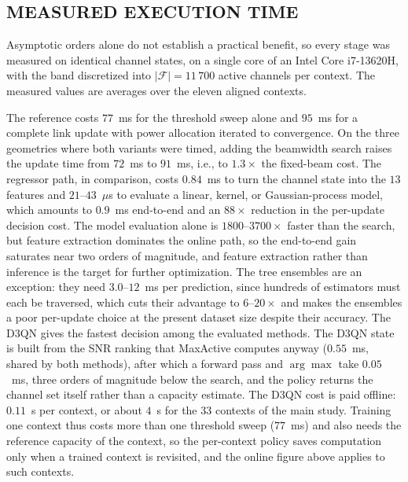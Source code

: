 \documentclass{ieee-ojvt}
\newcommand{\PLNCH}{11\,700}          %
\newcommand{\PLMASEL}{$77$~ms}        %
\newcommand{\PLMASTEP}{$95$~ms}       %
\newcommand{\PLMASTEPBW}{$91$~ms}     %
\newcommand{\PLPREDUS}{$0.9$~ms}      %
\begin{document}
\subsection{MEASURED EXECUTION TIME}
\label{sec:runtime}
Asymptotic orders alone do not establish a practical benefit, so every stage was measured
on identical channel states, on a single core of an Intel Core i7-13620H, with the band
discretized into $|\mathcal{F}|=\PLNCH$ active channels per context. The measured values
are averages over the eleven aligned contexts.

The reference costs \PLMASEL{} for the threshold sweep alone and \PLMASTEP{} for a
complete link update with power allocation iterated to convergence. On the three
geometries where both variants were timed, adding the beamwidth search raises the update
time from $72$~ms to \PLMASTEPBW{}, i.e., to $1.3\times$ the fixed-beam cost. The
regressor path, in comparison, costs $0.84$~ms to turn the channel state into the $13$
features and $21$--$43$~$\mu$s to evaluate a linear, kernel, or Gaussian-process model,
which amounts to \PLPREDUS{} end-to-end and an $88\times$ reduction in the per-update
decision cost. The model evaluation alone is $1800$--$3700\times$ faster than the search,
but feature extraction dominates the online path, so the end-to-end gain saturates near
two orders of magnitude, and feature extraction rather than inference is the target for
further optimization. The tree ensembles are an exception: they need $3.0$--$12$~ms per prediction, since
hundreds of estimators must each be traversed, which cuts their advantage to $6$--$20\times$ and makes the ensembles a poor
per-update choice at the present dataset size despite their accuracy. The D3QN gives the
fastest decision among the evaluated methods. The D3QN state is built from the SNR ranking that MaxActive
computes anyway ($0.55$~ms, shared by both methods), after which a forward pass and
$\arg\max$ take $0.05$~ms, three orders of magnitude below the search, and the policy
returns the channel set itself rather than a capacity estimate. The D3QN cost is paid
offline: $0.11$~s per context, or about $4$~s for the $33$ contexts of the main study.
Training one context thus costs more than one threshold sweep (\PLMASEL{}) and also needs
the reference capacity of the context, so the per-context policy saves computation only
when a trained context is revisited, and the online figure above applies to such
contexts.
\end{document}
